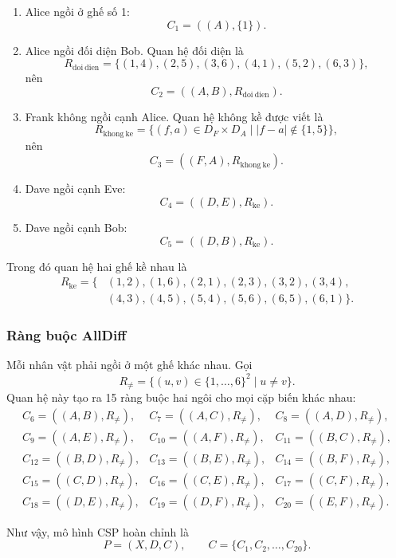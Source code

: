 \begin{enumerate}
    \item Alice ngồi ở ghế số 1:
    \[
        C_1=((A),\{1\}).
    \]

    \item Alice ngồi đối diện Bob. Quan hệ đối diện là
    \[
        R_{\mathrm{doi\ dien}}=
        \{(1,4),(2,5),(3,6),(4,1),(5,2),(6,3)\},
    \]
    nên
    \[
        C_2=((A,B),R_{\mathrm{doi\ dien}}).
    \]

    \item Frank không ngồi cạnh Alice. Quan hệ không kề được viết là
    \[
        R_{\mathrm{khong\ ke}}=
        \{(f,a)\in D_F\times D_A\mid |f-a|\notin\{1,5\}\},
    \]
    nên
    \[
        C_3=((F,A),R_{\mathrm{khong\ ke}}).
    \]

    \item Dave ngồi cạnh Eve:
    \[
        C_4=((D,E),R_{\mathrm{ke}}).
    \]

    \item Dave ngồi cạnh Bob:
    \[
        C_5=((D,B),R_{\mathrm{ke}}).
    \]
\end{enumerate}

Trong đó quan hệ hai ghế kề nhau là
\[
\begin{split}
R_{\mathrm{ke}}=\{&(1,2),(1,6),(2,1),(2,3),(3,2),(3,4),\\
                    &(4,3),(4,5),(5,4),(5,6),(6,5),(6,1)\}.
\end{split}
\]

\subsubsection{Ràng buộc AllDiff}

Mỗi nhân vật phải ngồi ở một ghế khác nhau. Gọi
\[
    R_{\ne}=\{(u,v)\in\{1,\ldots,6\}^2\mid u\ne v\}.
\]
Quan hệ này tạo ra 15 ràng buộc hai ngôi cho mọi cặp biến khác nhau:
\[
\begin{array}{lll}
 C_6=((A,B),R_{\ne}), & C_7=((A,C),R_{\ne}), & C_8=((A,D),R_{\ne}),\\
 C_9=((A,E),R_{\ne}), & C_{10}=((A,F),R_{\ne}), & C_{11}=((B,C),R_{\ne}),\\
 C_{12}=((B,D),R_{\ne}), & C_{13}=((B,E),R_{\ne}), & C_{14}=((B,F),R_{\ne}),\\
 C_{15}=((C,D),R_{\ne}), & C_{16}=((C,E),R_{\ne}), & C_{17}=((C,F),R_{\ne}),\\
 C_{18}=((D,E),R_{\ne}), & C_{19}=((D,F),R_{\ne}), & C_{20}=((E,F),R_{\ne}).
\end{array}
\]

Như vậy, mô hình CSP hoàn chỉnh là
\[
    P=(X,D,C),\qquad C=\{C_1,C_2,\ldots,C_{20}\}.
\]

